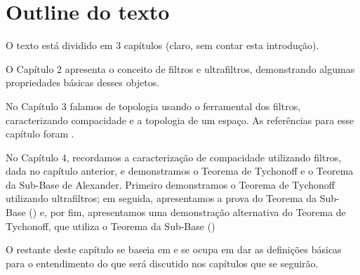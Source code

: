 \section{Outline do texto}

 
 O texto está dividido em 3 capítulos 
 (claro, sem contar esta introdução).
 
 O Capítulo 2 apresenta o conceito de
 filtros e ultrafiltros, demonstrando algumas
 propriedades básicas desses objetos.
 
 No Capítulo 3 falamos de topologia usando
 o ferramental dos filtros, caracterizando
 compacidade e a topologia de um espaço.
 As referências para esse capítulo foram \cite{caldas, videoultra, moorhouse}.
 
 No Capítulo 4, recordamos a caracterização de
 compacidade utilizando filtros, dada no capítulo
 anterior, e demonstramos o Teorema de Tychonoff e
 o Teorema da Sub-Base de Alexander. 
 Primeiro demonstramos o Teorema de Tychonoff 
 utilizando ultrafiltros; em seguida, 
 apresentamos a prova do Teorema da Sub-Base 
 (\cite{WikiAlexander})
 e, por fim, apresentamos uma demonstração
 alternativa do Teorema de Tychonoff, que
 utiliza o Teorema da Sub-Base (\cite{WikiTychonoff})
 
 O restante deste capítulo se baseia em 
 \cite{caldas, munkres} e se ocupa em dar 
 as definições básicas para o entendimento 
 do que será discutido nos capítulos que se seguirão.